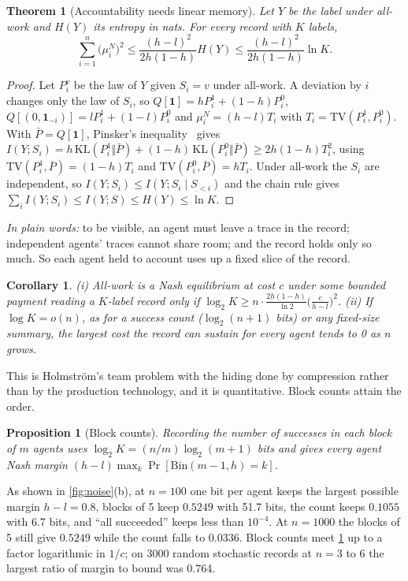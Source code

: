 \documentclass[sigconf,anonymous,acmthm=false]{acmart}
\theoremstyle{acmplain}
\newtheorem{theorem}{Theorem}
\newtheorem{proposition}{Proposition}
\newtheorem{corollary}{Corollary}
\theoremstyle{acmdefinition}
\newcommand{\plain}[1]{\par\smallskip\noindent\textit{In plain words:} #1\par\smallskip}
\newcommand{\TV}{\mathrm{TV}}
\begin{document}
\begin{theorem}[Accountability needs linear memory]\label{thm:noisy}
Let $Y$ be the label under all-work and $H(Y)$ its entropy in nats. For every record with
$K$ labels,
\[ \sum_{i=1}^n\big(\mu_i^N\big)^2\le\frac{(h-l)^2}{2h(1-h)}H(Y)\le\frac{(h-l)^2}{2h(1-h)}\ln K. \]
\end{theorem}

\begin{proof}
Let $P_i^v$ be the law of $Y$ given $S_i=v$ under all-work. A deviation by $i$ changes only
the law of $S_i$, so $Q[\mathbf1]=hP_i^1+(1-h)P_i^0$, $Q[(0,\mathbf1_{-i})]=lP_i^1+(1-l)P_i^0$
and $\mu_i^N=(h-l)T_i$ with $T_i=\TV(P_i^1,P_i^0)$. With $\bar P=Q[\mathbf1]$, Pinsker's
inequality~\cite{cover2006} gives
$I(Y;S_i)=h\,\mathrm{KL}(P_i^1\Vert\bar P)+(1-h)\,\mathrm{KL}(P_i^0\Vert\bar P)\ge2h(1-h)T_i^2$,
using $\TV(P_i^1,\bar P)=(1-h)T_i$ and $\TV(P_i^0,\bar P)=hT_i$. Under all-work the $S_i$ are
independent, so $I(Y;S_i)\le I(Y;S_i\mid S_{<i})$ and the chain rule gives
$\sum_iI(Y;S_i)\le I(Y;S)\le H(Y)\le\ln K$.
\end{proof}

\plain{to be visible, an agent must leave a trace in the record; independent agents' traces
cannot share room; and the record holds only so much. So each agent held to account uses up
a fixed slice of the record.}

\begin{corollary}\label{cor:noisy}
(i) All-work is a Nash equilibrium at cost $c$ under some bounded payment reading a
$K$-label record only if $\log_2K\ge n\cdot\frac{2h(1-h)}{\ln2}\big(\frac c{h-l}\big)^2$.
(ii) If $\log K=o(n)$, as for a success count ($\log_2(n+1)$ bits) or any fixed-size
summary, the largest cost the record can sustain for every agent tends to 0 as $n$ grows.
\end{corollary}

This is Holmstr\"om's team problem with the hiding done by compression rather than by the
production technology, and it is quantitative. Block counts attain the order.

\begin{proposition}[Block counts]\label{prop:blocks}
Recording the number of successes in each block of $m$ agents uses
$\log_2K=(n/m)\log_2(m+1)$ bits and gives every agent Nash margin
$(h-l)\max_k\Pr[\mathrm{Bin}(m-1,h)=k]$.
\end{proposition}

As shown in \cref{fig:noise}(b), at $n=100$ one bit per agent keeps the largest possible
margin $h-l=0.8$, blocks of 5 keep $0.5249$ with 51.7 bits, the count keeps $0.1055$ with
6.7 bits, and ``all succeeded'' keeps less than $10^{-4}$. At $n=1000$ the blocks of 5 still
give $0.5249$ while the count falls to $0.0336$. Block counts meet \cref{thm:noisy} up to a
factor logarithmic in $1/c$; on 3000 random stochastic records at $n=3$ to 6 the largest
ratio of margin to bound was 0.764.
\end{document}
